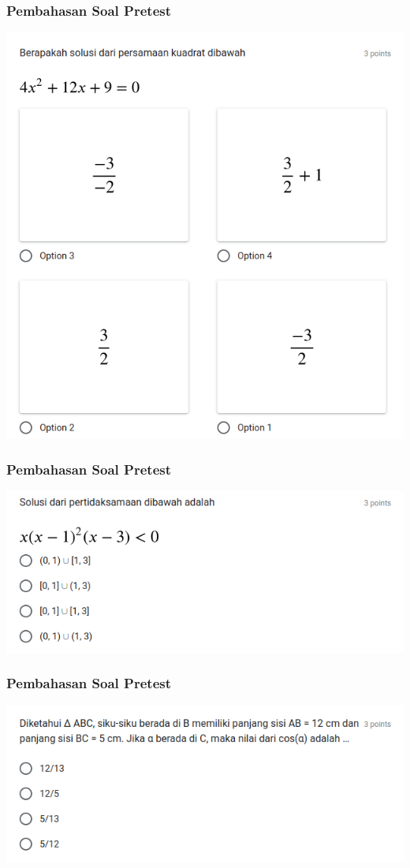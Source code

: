 \documentclass[pdflatex,compress,mathserif]{beamer}
\begin{document}
	\begin{frame}
		\frametitle{Pembahasan Soal Pretest}
		\begin{center}
			\includegraphics[width=0.6\linewidth]{img/img28}
		\end{center}
	\end{frame}
	
	\begin{frame}
		\frametitle{Pembahasan Soal Pretest}
		\begin{center}
			\includegraphics[width=\linewidth]{img/img29}
		\end{center}
	\end{frame}
	
	\begin{frame}
		\frametitle{Pembahasan Soal Pretest}
		\begin{center}
			\includegraphics[width=\linewidth]{img/img30}
		\end{center}
	\end{frame}
	
\end{document}
